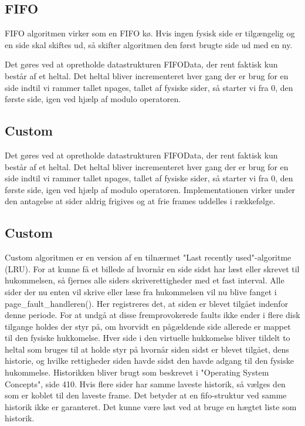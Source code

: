 \subsection{FIFO}
FIFO algoritmen virker som en FIFO kø. Hvis ingen fysisk side er tilgængelig og en side skal skiftes ud, så skifter algoritmen den først brugte side ud med en ny.

Det gøres ved at opretholde datastrukturen FIFOData, der rent faktisk kun består af et heltal. Det heltal bliver incrementeret hver gang der er brug for en side indtil vi rammer tallet npages, tallet af fysiske sider, så starter vi fra 0, den første side, igen ved hjælp af modulo operatoren.

\subsection{Custom}
Det gøres ved at opretholde datastrukturen FIFOData, der rent faktisk kun består af et heltal. Det heltal bliver incrementeret hver gang der er brug for en side indtil vi rammer tallet npages, tallet af fysiske sider, så starter vi fra 0, den første side, igen ved hjælp af modulo operatoren. Implementationen virker under den antagelse at sider aldrig frigives og at frie frames uddelles i rækkefølge.

\subsection{Custom}
Custom algoritmen er en version af en tilnærmet "Last recently used"-algoritme (LRU). For at kunne få et billede af hvornår en side sidst har læst eller skrevet til hukommelsen, så fjernes alle siders skriverettigheder med et fast interval. Alle sider der nu enten vil skrive eller læse fra hukommelsen vil nu blive fanget i page_fault_handleren(). Her registreres det, at siden er blevet tilgået indenfor denne periode. For at undgå at disse fremprovokerede faults ikke ender i flere disk tilgange holdes der styr på, om hvorvidt en pågældende side allerede er mappet til den fysiske hukkomelse.
Hver side i den virtuelle hukkomelse bliver tildelt to heltal som bruges til at holde styr på hvornår siden sidst er blevet tilgået, dens historie, og hvilke rettigheder siden havde sidst den havde adgang til den fysiske hukommelse. Historikken bliver brugt som beskrevet i "Operating System Concepts", side 410. Hvis flere sider har samme laveste historik, så vælges den som er koblet til den laveste frame. Det betyder at en fifo-struktur ved samme historik ikke er garanteret. Det kunne være løst ved at bruge en hægtet liste som historik.
